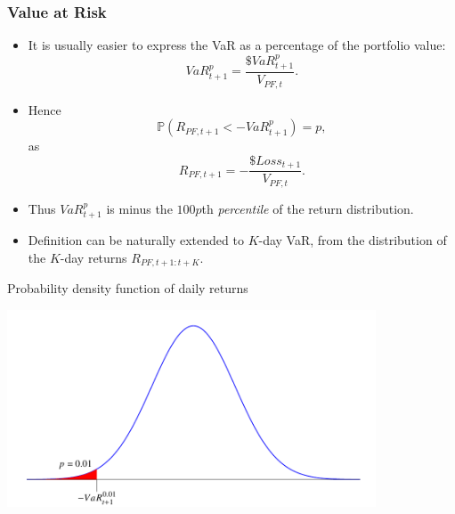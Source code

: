 \begin{frame}%

\frametitle{Value at Risk}

\begin{itemize}
\item It is usually easier to express the VaR as a percentage of the portfolio value:
\begin{equation*}
VaR_{t+1}^{p}=\frac{\$VaR_{t+1}^{p}}{V_{PF,t}}.
\end{equation*}

\item Hence
\begin{equation*}
\mathbb{P} (R_{PF,t+1}<-VaR_{t+1}^{p})=p,
\end{equation*}%
as
\begin{equation*}
R_{PF,t+1}=-\frac{\$Loss_{t+1}}{V_{PF,t}}.
\end{equation*}

\item Thus $VaR_{t+1}^{p}$ is minus the $100p$th \emph{\color{red}percentile}
of the return distribution.

\item Definition can be naturally extended to $K$-day VaR, from the
distribution of the $K$-day returns $R_{PF,t+1:t+K}$.
\end{itemize}

\end{frame}%

\begin{frame}%

\begin{block}{Probability density function of daily returns}
\centerline{\includegraphics[height=2.3in]{density}}
\end{block}

\end{frame}%

